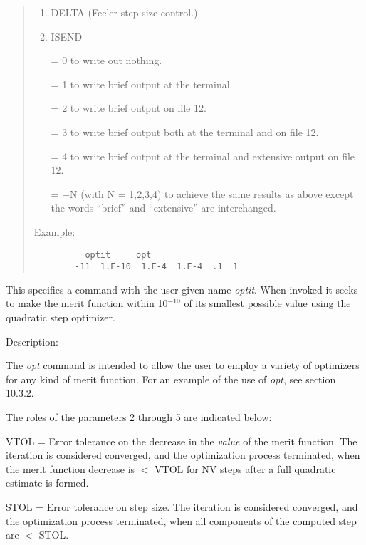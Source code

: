 \begin{quotation}
\begin{enumerate}
       \item  DELTA (Feeler step size control.)

       \item  ISEND

              = 0 to write out nothing.

              = 1 to write brief output at the terminal.

              = 2 to write brief output on file 12.

              = 3 to write brief output both at the terminal and on file 12.

              = 4 to write brief output at the terminal and extensive output on file 12.

              = $-$N (with N = 1,2,3,4) to achieve the same results as above except the
               \hspace*{1em}words ``brief'' and ``extensive'' are interchanged.
\end{enumerate}

\vspace{5mm}
\noindent Example:
\begin{verbatim}
          optit     opt
        -11  1.E-10  1.E-4  1.E-4  .1  1
\end{verbatim}
\end{quotation}
This specifies a command with the user given name {\em optit}.  When invoked it seeks to make the merit function within 10$^{-10}$ of its smallest possible value using the quadratic step optimizer.

\vspace{5mm}
     Description:

The {\em opt} command is intended to allow the user to employ a variety of optimizers for any kind of merit function.  For an example of the use of {\em opt}, see section 10.3.2.

The roles of the parameters 2 through 5 are indicated below:

    	 VTOL =  Error tolerance on the decrease in the {\em value} of the merit
	 function.  The \hspace*{6.15em}iteration is considered converged, and the optimization
	 process terminated, \hspace*{6.15em}when the merit function decrease is $<$ VTOL for NV
	 steps after a full quadratic \hspace*{6.15em}estimate is formed.

	 STOL =  Error tolerance on step size.  The iteration is considered
	 converged, and the \hspace*{6.15em}optimization
	 process terminated, when all components of the computed step \hspace*{6.15em}are
	 $<$ STOL.

